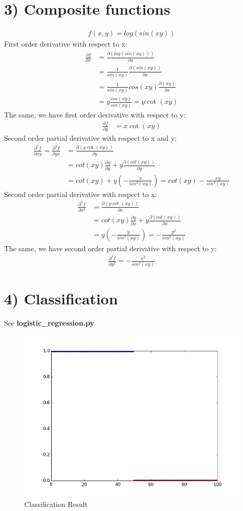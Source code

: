 \documentclass{article}
\begin{document}
\section*{3) Composite functions}
\begin{align*}
f(x, y) = log(sin(xy)) 
\end{align*}
First order derivative with respect to x:
\begin{align*}
\frac{\partial f}{\partial x} &= \frac{\partial (log(sin(xy)) )}{\partial x}\\
&= \frac{1}{sin(xy)} \frac{\partial (sin(xy))}{\partial x}\\
&= \frac{1}{sin(xy)} cos(xy) \frac{\partial (xy)}{\partial x}\\
&= y\frac{cos(xy)}{sin(xy)} = y\cot(xy)
\end{align*}
The same, we have first order derivative with respect to y:
\begin{align*}
\frac{\partial f}{\partial y} &= x\cot(xy)
\end{align*}
Second order partial derivative with respect to x and y:
\begin{align*}
\frac{\partial^2 f}{\partial xy} = \frac{\partial^2 f}{\partial yx} &=  \frac{\partial(y\cot(xy))}{\partial y}\\
&=cot(xy)\frac{\partial y}{\partial y} + y\frac{\partial(cot(xy))}{\partial y}\\
&= cot(xy) + y(-\frac{x}{sin^2(xy)}) = cot(xy) - \frac{xy}{sin^2(xy)}
\end{align*}
Second order partial derivative with respect to x:
\begin{align*}
\frac{\partial^2 f}{\partial x^2} &=  \frac{\partial(y\cot(xy))}{\partial x}\\
&=cot(xy)\frac{\partial y}{\partial x} + y\frac{\partial(cot(xy))}{\partial x}\\
&= y(-\frac{y}{sin^2(xy)}) = - \frac{y^2}{sin^2(xy)}
\end{align*}
The same, we have second order partial derivative with respect to y:
\begin{align*}
\frac{\partial^2 f}{\partial y^2} =- \frac{x^2}{sin^2(xy)}
\end{align*}

\section*{4) Classification}
See \textbf{logistic\_regression.py}
\begin{figure}[H]
	\centering
	\includegraphics[scale=0.5]{classify.png}
	\caption{Classification Result}
	\label{fig3}	
\end{figure}
\end{document}
